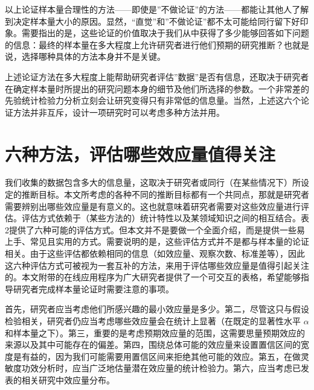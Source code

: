 \documentclass[
  letterpaper,
  DIV=11,
  numbers=noendperiod]{scrreprt}
\begin{document}
以上论证样本量合理性的方法------即使是''不做论证''的方法------都能让其他人了解到决定样本量大小的原因。显然，``直觉''和''不做论证''都不太可能给同行留下好印象。需要指出的是，这些论证的价值取决于我们从中获得了多少能够回答如下问题的信息：最终的样本量在多大程度上允许研究者进行他们预期的研究推断？也就是说，选择哪种具体的方法本身并不是关键。

上述论证方法在多大程度上能帮助研究者评估''数据''是否有信息，还取决于研究者在确定样本量时所提出的研究问题本身的细节及他们所选择的参数。一个非常差的先验统计检验力分析立刻会让研究变得只有非常低的信息量。当然，上述这六个论证方法并非互斥，设计一项研究时可以考虑多种方法并用。

\hypertarget{ux516dux79cdux65b9ux6cd5ux8bc4ux4f30ux54eaux4e9bux6548ux5e94ux91cfux503cux5f97ux5173ux6ce8}{%
\section{六种方法，评估哪些效应量值得关注}\label{ux516dux79cdux65b9ux6cd5ux8bc4ux4f30ux54eaux4e9bux6548ux5e94ux91cfux503cux5f97ux5173ux6ce8}}

我们收集的数据包含多大的信息量，这取决于研究者或同行（在某些情况下）所设定的推断目标。本文所考虑的各种不同的推断目标都有一个共同点，那就是研究者需要辨别出哪些效应量是有意义的。这也就意味着研究者需要对这些效应量进行评估。评估方式依赖于（某些方法的）统计特性以及某领域知识之间的相互结合。表2提供了六种可能的评估方式。但本文并不是要做一个全面介绍，而是提供一些易上手、常见且实用的方式。需要说明的是，这些评估方式并不是都与样本量的论证相关。由于这些评估都依赖相同的信息（如效应量、观察次数、标准差等），因此这六种评估方式可被视为一套互补的方法，来用于评估哪些效应量是值得引起关注的。本文附带的在线应用程序为广大研究者提供了一个可交互的表格，希望能够指导研究者完成样本量论证时需要注意的事项。

首先，研究者应当考虑他们所感兴趣的最小效应量是多少。第二，尽管这只与假设检验相关，研究者仍应当考虑哪些效应量会在统计上显著（在既定的显著性水平
\(\alpha\)
和样本量之下）。第三，重要的是考虑预期效应量的范围，这需要思量预期效应的来源以及其中可能存在的偏差。第四，围绕总体可能的效应量来设置置信区间的宽度是有益的，因为我们可能需要用置信区间来拒绝其他可能的效应。第五，在做灵敏度功效分析时，应当广泛地估量潜在效应量的统计检验力。第六，应当考虑已发表的相关研究中效应量分布。
\end{document}
